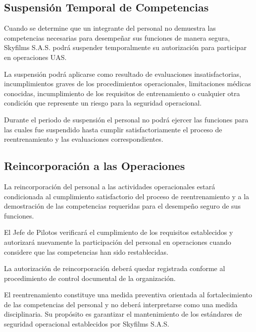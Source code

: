 \subsection{Suspensión Temporal de Competencias}

Cuando se determine que un integrante del personal no demuestra las competencias necesarias para desempeñar sus funciones de manera segura, Skyfilms S.A.S. podrá suspender temporalmente su autorización para participar en operaciones UAS.

La suspensión podrá aplicarse como resultado de evaluaciones insatisfactorias, incumplimientos graves de los procedimientos operacionales, limitaciones médicas conocidas, incumplimiento de los requisitos de entrenamiento o cualquier otra condición que represente un riesgo para la seguridad operacional.

Durante el periodo de suspensión el personal no podrá ejercer las funciones para las cuales fue suspendido hasta cumplir satisfactoriamente el proceso de reentrenamiento y las evaluaciones correspondientes.



\subsection{Reincorporación a las Operaciones}

La reincorporación del personal a las actividades operacionales estará condicionada al cumplimiento satisfactorio del proceso de reentrenamiento y a la demostración de las competencias requeridas para el desempeño seguro de sus funciones.

El Jefe de Pilotos verificará el cumplimiento de los requisitos establecidos y autorizará nuevamente la participación del personal en operaciones cuando considere que las competencias han sido restablecidas.

La autorización de reincorporación deberá quedar registrada conforme al procedimiento de control documental de la organización.


\begin{tcolorbox}[
title=Nota Operacional,
colback=gray!5,
colframe=black]

El reentrenamiento constituye una medida preventiva orientada al fortalecimiento de las competencias del personal y no deberá interpretarse como una medida disciplinaria. Su propósito es garantizar el mantenimiento de los estándares de seguridad operacional establecidos por Skyfilms S.A.S.

\end{tcolorbox}

